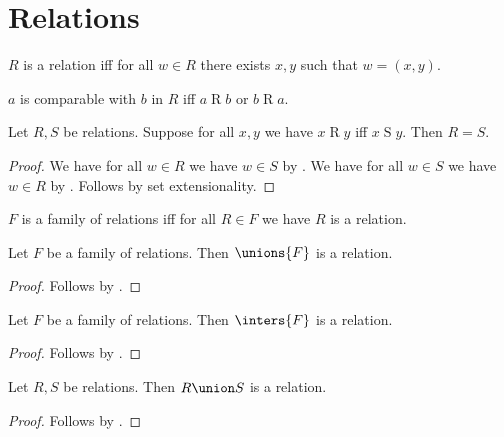 



\section{Relations}

\begin{definition}\label{relation}
    $R$ is a relation iff
    for all $w\in R$ there exists $x, y$ such that $w = (x, y)$.
\end{definition}

\begin{definition}\label{comparable}
    $a$ is comparable with $b$ in $R$ iff $a\mathrel{R}b$ or $b\mathrel{R}a$.
\end{definition}

\begin{proposition}\label{relext}
    Let $R, S$ be relations.
    Suppose for all $x,y$ we have $x\mathrel{R} y$ iff $x\mathrel{S} y$.
    Then $R = S$.
\end{proposition}
\begin{proof}
    We have for all $w\in R$ we have $w\in S$ by .
    We have for all $w\in S$ we have $w\in R$ by .
    Follows by set extensionality.
\end{proof}

\begin{abbreviation}\label{family_of_relations}
    $F$ is a family of relations iff
    for all $R\in F$ we have $R$ is a relation.
\end{abbreviation}

\begin{proposition}\label{unions_of_family_of_relations_is_relation}
    Let $F$ be a family of relations.
    Then $\unions{F}$ is a relation.
\end{proposition}
\begin{proof}
    Follows by .
\end{proof}

\begin{proposition}\label{inters_of_family_of_relations_is_relation}
    Let $F$ be a family of relations.
    Then $\inters{F}$ is a relation.
\end{proposition}
\begin{proof}
    Follows by .
\end{proof}

\begin{proposition}\label{union_relations_is_relation}
    Let $R, S$ be relations.
    Then $R\union S$ is a relation.
\end{proposition}
\begin{proof}
    Follows by .
\end{proof}

